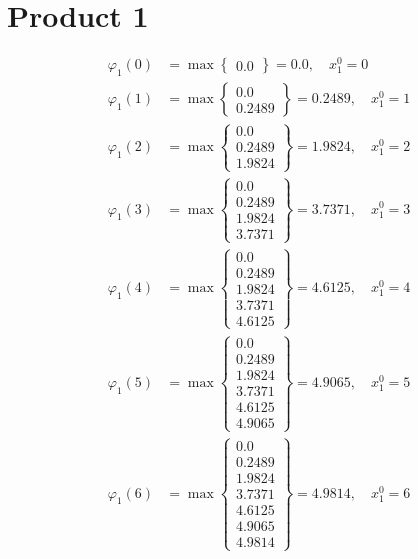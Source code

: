 \documentclass{article}
\begin{document}
\section{Product 1}
\begin{align*}
\varphi_{1}(0) &= \max \left\{ \begin{array}{c}
0.0
\end{array} \right\}=0.0, \quad x_{1}^0=0\\
  
\varphi_{1}(1) &= \max \left\{ \begin{array}{c}
0.0 \\
 0.2489
\end{array} \right\}=0.2489, \quad x_{1}^0=1\\
  
\varphi_{1}(2) &= \max \left\{ \begin{array}{c}
0.0 \\
 0.2489 \\
 1.9824
\end{array} \right\}=1.9824, \quad x_{1}^0=2\\
  
\varphi_{1}(3) &= \max \left\{ \begin{array}{c}
0.0 \\
 0.2489 \\
 1.9824 \\
 3.7371
\end{array} \right\}=3.7371, \quad x_{1}^0=3\\
  
\varphi_{1}(4) &= \max \left\{ \begin{array}{c}
0.0 \\
 0.2489 \\
 1.9824 \\
 3.7371 \\
 4.6125
\end{array} \right\}=4.6125, \quad x_{1}^0=4\\
  
\varphi_{1}(5) &= \max \left\{ \begin{array}{c}
0.0 \\
 0.2489 \\
 1.9824 \\
 3.7371 \\
 4.6125 \\
 4.9065
\end{array} \right\}=4.9065, \quad x_{1}^0=5\\
  
\varphi_{1}(6) &= \max \left\{ \begin{array}{c}
0.0 \\
 0.2489 \\
 1.9824 \\
 3.7371 \\
 4.6125 \\
 4.9065 \\
 4.9814
\end{array} \right\}=4.9814, \quad x_{1}^0=6\\
  

\end{align*}
\end{document}
